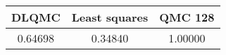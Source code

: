 \begin{tabular}{|c|c|c|}
\hline
DLQMC&Least squares&QMC 128\\ 
\hline

0.64698 & 0.34840 & 1.00000\\ 
\hline
\end{tabular}

